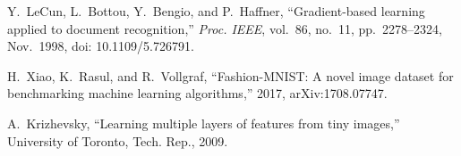 Y.~LeCun, L.~Bottou, Y.~Bengio, and P.~Haffner,
``Gradient-based learning applied to document recognition,''
\emph{Proc. IEEE}, vol.~86, no.~11, pp.~2278--2324, Nov.~1998,
doi: 10.1109/5.726791.

H.~Xiao, K.~Rasul, and R.~Vollgraf,
``Fashion-MNIST: A novel image dataset for benchmarking machine learning
algorithms,'' 2017, arXiv:1708.07747.

A.~Krizhevsky, ``Learning multiple layers of features from tiny images,''
University of Toronto, Tech. Rep., 2009.
